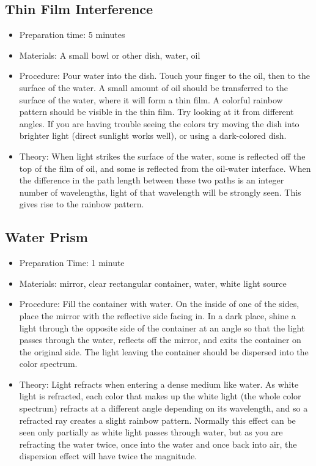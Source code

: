 \subsection{Thin Film Interference}
\begin{itemize}
\item{Preparation time: 5 minutes}
\item{Materials: A small bowl or other dish, water, oil}
\item{Procedure: Pour water into the dish. Touch your finger to the oil, then to the surface of the water. A small amount of oil should be transferred to the surface of the water, where it will form a thin film. A colorful rainbow pattern should be visible in the thin film. Try looking at it from different angles. If you are having trouble seeing the colors try moving the dish into brighter light (direct sunlight works well), or using a dark-colored dish.}
\item{Theory: When light strikes the surface of the water, some is reflected off the top of the film of oil, and some is reflected from the oil-water interface. When the difference in the path length between these two paths is an integer number of wavelengths, light of that wavelength will be strongly seen. This gives rise to the rainbow pattern.}
\end{itemize}

\subsection{Water Prism}
\begin{itemize}
\item{Preparation Time: 1 minute}
\item{Materials: mirror, clear rectangular container, water, white light source}
\item{Procedure: Fill the container with water. On the inside of one of the sides, place the mirror with the reflective side facing in. In a dark place, shine a light through the opposite side of the container at an angle so that the light passes through the water, reflects off the mirror, and exits the container on the original side. The light leaving the container should be dispersed into the color spectrum.}
\item{Theory: Light refracts when entering a dense medium like water. As white light is refracted, each color that makes up the white light (the whole color spectrum) refracts at a different angle depending on its wavelength, and so a refracted ray creates a slight rainbow pattern. Normally this effect can be seen only partially as white light passes through water, but as you are refracting the water twice, once into the water and once back into air, the dispersion effect will have twice the magnitude.}
\end{itemize}

